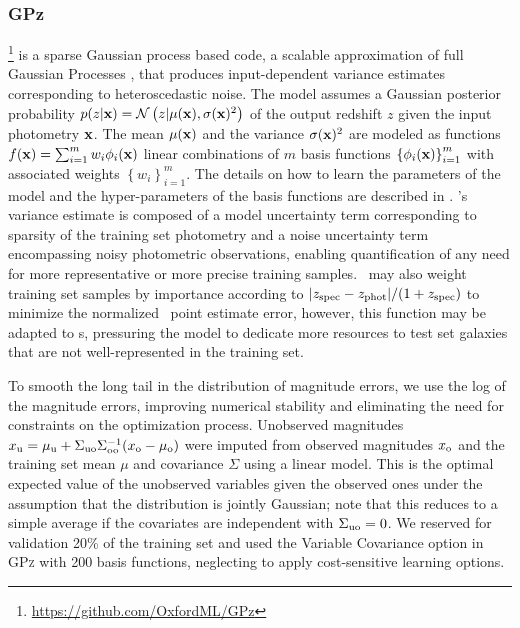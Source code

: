 \subsubsection{GPz}

\gpz \footnote{\url{https://github.com/OxfordML/GPz}} \citep{Almosallam:16a,Almosallam:15b} is a sparse Gaussian process based code, a scalable approximation of full Gaussian Processes \citep{Rasmussen:06}, that produces input-dependent variance estimates corresponding to heteroscedastic noise.
The model assumes a Gaussian posterior probability $p(z \vert {\mathbf{x}}) = \mathcal{N}\left(z \vert \mu({\mathbf{x}}), \sigma({\mathbf{x}})^{2}\right)$ of the output redshift $z$ given the input photometry ${\mathbf{x}}$.
The mean $\mu({\mathbf{x}})$ and the variance $\sigma({\mathbf{x}})^{2}$ are modeled as functions $f({\mathbf{x}}) = \sum_{i=1}^{m}w_{i}\phi_{i}({\mathbf{x}})$ linear combinations of $m$ basis functions $\left\{\phi_{i}({\mathbf{x}})\right\}_{i=1}^{m}$ with associated weights $\left\{w_{i}\right\}_{i=1}^{m}$.
The details on how to learn the parameters of the model and the hyper-parameters of the basis functions are described in \citet{Almosallam:15b}.
\gpz's variance estimate is composed of a model uncertainty term corresponding to sparsity of the training set photometry and a noise uncertainty term encompassing noisy photometric observations, enabling quantification of any need for more representative or more precise training samples.
\gpz\ may also weight training set samples by importance according to $|z_{\rm{spec}} - z_{\rm{phot}}| / (1+z_{\rm{spec}})$ to minimize the normalized \pz\ point estimate error, however, this function may be adapted to \pzpdf s, pressuring the model to dedicate more resources to test set galaxies that are not well-represented in the training set.

To smooth the long tail in the distribution of magnitude errors, we use the log of the magnitude errors, improving numerical stability and eliminating the need for constraints on the optimization process.
Unobserved magnitudes $x_{\rm u} = \mu_{\rm u} + \Sigma_{\rm uo}\Sigma_{\rm oo}^{-1}(x_{\rm o} - \mu_{\rm o})$ were imputed from observed magnitudes $x_{\rm o}$ and the training set mean $\mu$ and covariance $\Sigma$ using a linear model.
This is the optimal expected value of the unobserved variables given the observed ones under the assumption that the distribution is jointly Gaussian; note that this reduces to a simple average if the covariates are independent with $\Sigma_{\rm uo} = 0$.
We reserved for validation 20\% of the training set and used the Variable Covariance option in \textsc{GPz} with 200 basis functions, neglecting to apply cost-sensitive learning options.

